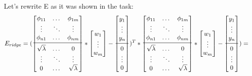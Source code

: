 \documentclass[11pt]{article}
\newcommand{\exercise}{\section{}}
\begin{document}
\exercise
Let's rewrite E as it was shown in the task:
\[E_{ridge}=(
\begin{bmatrix}
    \phi_{11}  & \dots  & \phi_{1m} \\
    \vdots  & \ddots & \vdots \\
    \phi_{n1}  & \dots  & \phi_{nm} \\ 
    \midrule
     \sqrt{\lambda}    & \dots  & 0 \\
     \vdots &   \ddots & \vdots \\
     0  & \dots   & \sqrt{\lambda} \\
\end{bmatrix}*
\begin{bmatrix}
  w_{1}\\
  \vdots \\
  w_{m}
\end{bmatrix} - 
\begin{bmatrix}
  y_{1}\\
  \vdots \\
  y_{n}\\
  \midrule
  0\\
  \vdots\\
  0
\end{bmatrix} )^T*
\begin{bmatrix}
    \phi_{11}  & \dots  & \phi_{1m} \\
    \vdots  & \ddots & \vdots \\
    \phi_{n1}  & \dots  & \phi_{nm} \\ 
    \midrule
     \sqrt{\lambda}    & \dots  & 0 \\
     \vdots &   \ddots & \vdots \\
     0  & \dots   & \sqrt{\lambda} \\
\end{bmatrix}*
\begin{bmatrix}
  w_{1}\\
  \vdots \\
  w_{m}
\end{bmatrix} - 
\begin{bmatrix}
  y_{1}\\
  \vdots \\
  y_{n}\\
  \midrule
  0\\
  \vdots\\
  0
\end{bmatrix} )=
\]
\end{document}
